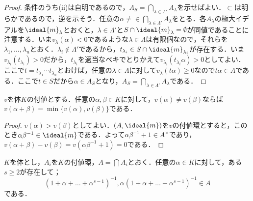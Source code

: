 \begin{proof}
	条件のうち(ii)は自明であるので，$A_S=\bigcap_{\lambda\in\Lambda'}A_\lambda$を示せばよい．$\subset$は明らかであるので，逆を示そう．任意の$\alpha\neq\in\bigcap_{\lambda\in\Lambda'}A_\lambda$をとる．各$A_\lambda$の極大イデアルを$\ideal{m}_\lambda$とおくと，$\lambda\in\Lambda'$と$S\cap\ideal{m}_\lambda=\emptyset$が同値であることに注意する．いま$v_\lambda(\alpha)<0$であるような$\lambda\in\Lambda$は有限個なので，それらを$\lambda_1,\dots,\lambda_n$とおく．$\lambda_i\not\in\Lambda'$であるから，$t_{\lambda_i}\in S\cap\ideal{m}_{\lambda_i}$が存在する．いま$v_{\lambda_i}(t_{\lambda_i})>0$だから，$t_{\lambda_i}$を適当なベキでとりかえて$v_{\lambda_i}(t_{\lambda_i}\alpha)>0$としてよい．ここで$t=t_{\lambda_1}\cdots t_{\lambda_n}$とおけば，任意の$\lambda\in\Lambda$に対して$v_\lambda(t\alpha)\geq 0$なので$t\alpha\in A$である．ここで$t\in S$だから$\alpha\in A_S$となり，$A_S=\bigcap_{\lambda\in\Lambda'}A_\lambda$である．
\end{proof}

\begin{lem}
	$v$を体$K$の付値とする．任意の$\alpha,\beta\in K$に対して，$v(\alpha)\neq v(\beta)$ならば$v(\alpha+\beta)=\min\{v(\alpha),v(\beta)\}$である．
\end{lem}

\begin{proof}
	$v(\alpha)>v(\beta)$としてよい．$(A,\ideal{m})$を$v$の付値環とすると，このとき$\alpha\beta^{-1}\in\ideal{m}$である．よって$\alpha\beta^{-1}+1\in A^\times$であり，$v(\alpha+\beta)-v(\beta)=v(\alpha\beta^{-1}+1)=0$である．
\end{proof}

%

\begin{prop}
	$K$を体とし，$A_i$を$K$の付値環，$A=\bigcap A_i$とおく．任意の$\alpha\in K$に対して，ある$s\geq 2$が存在して；
	\[(1+\alpha+\dots+\alpha^{s-1})^{-1}, \alpha(1+\alpha+\dots+\alpha^{s-1})^{-1}\in A\]
	である．
\end{prop}

